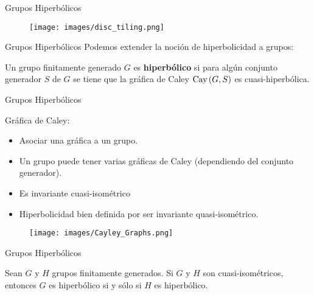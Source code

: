 \documentclass[xcolor=dvipsnames,aspectratio=159]{beamer}
\theoremstyle{largebreak}
\newcommand{\Cay}[1]{\ensuremath{\textup{Cay}\left(#1\right)}}
\begin{document}
\begin{frame}
    \begin{center}
        \Large Grupos Hiperbólicos
    \end{center}
    \begin{figure}
        \begin{center}
            \texttt{[image: images/disc\_tiling.png]}
        \end{center}
    \end{figure}
\end{frame}

\begin{frame}{Grupos Hiperbólicos}
    Podemos extender la noción de hiperbolicidad a grupos:

    \begin{mydef}
        Un grupo finitamente generado $G$ es \textbf{hiperbólico} si para algún conjunto generador $S$ de $G$ se tiene que la gráfica de Caley $\Cay{G,S}$ es cuasi-hiperbólica.
    \end{mydef}
\end{frame}

\begin{frame}{Grupos Hiperbólicos}
    \begin{center}
        \Large Gráfica de Caley:
    \end{center}
    \begin{itemize}
        \item Asociar una gráfica a un grupo.
        \item Un grupo puede tener varias gráficas de Caley (dependiendo del conjunto generador).
        \item Es invariante cuasi-isométrico
        \item Hiperbolicidad bien definida por ser invariante quasi-isométrico.
    \end{itemize}

    \pause

    \begin{figure}
        \begin{center}
            \texttt{[image: images/Cayley\_Graphs.png]}
        \end{center}
    \end{figure}
    
\end{frame}

\begin{frame}{Grupos Hiperbólicos}
    \begin{propo}
        Sean $G$ y $H$ grupos finitamente generados.  Si $G$ y $H$ son cuasi-isométricos, entonces $G$ es hiperbólico si y sólo si $H$ es hiperbólico.
    \end{propo}
\end{frame}
\end{document}
